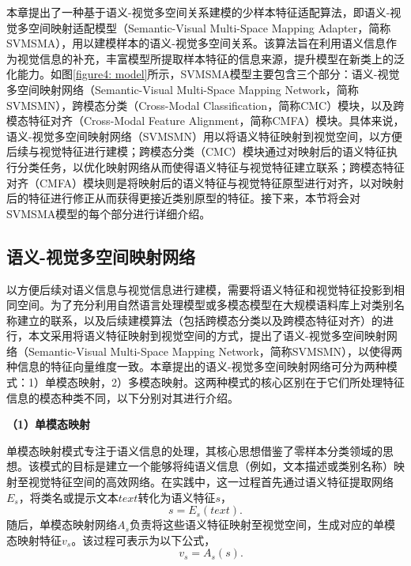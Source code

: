 本章提出了一种基于语义-视觉多空间关系建模的少样本特征适配算法，即语义-视觉多空间映射适配模型（Semantic-Visual Multi-Space Mapping Adapter，简称SVMSMA），用以建模样本的语义-视觉多空间关系。该算法旨在利用语义信息作为视觉信息的补充，丰富模型所提取样本特征的信息来源，提升模型在新类上的泛化能力。如图\ref{figure4: model}所示，SVMSMA模型主要包含三个部分：语义-视觉多空间映射网络（Semantic-Visual Multi-Space Mapping Network，简称SVMSMN），跨模态分类（Cross-Modal Classification，简称CMC）模块，以及跨模态特征对齐（Cross-Modal Feature Alignment，简称CMFA）模块。具体来说，语义-视觉多空间映射网络（SVMSMN）用以将语义特征映射到视觉空间，以方便后续与视觉特征进行建模；跨模态分类（CMC）模块通过对映射后的语义特征执行分类任务，以优化映射网络从而使得语义特征与视觉特征建立联系；跨模态特征对齐（CMFA）模块则是将映射后的语义特征与视觉特征原型进行对齐，以对映射后的特征进行修正从而获得更接近类别原型的特征。接下来，本节将会对SVMSMA模型的每个部分进行详细介绍。

\subsection[\hspace{-2pt}语义-视觉多空间映射网络]{{\heiti{} \hspace{-8pt}语义-视觉多空间映射网络}}\label{section4: 语义-视觉多空间映射网络}

以方便后续对语义信息与视觉信息进行建模，需要将语义特征和视觉特征投影到相同空间。为了充分利用自然语言处理模型或多模态模型在大规模语料库上对类别名称建立的联系，以及后续建模算法（包括跨模态分类以及跨模态特征对齐）的进行，本文采用将语义特征映射到视觉空间的方式，提出了语义-视觉多空间映射网络（Semantic-Visual Multi-Space Mapping Network，简称SVMSMN），以使得两种信息的特征向量维度一致。本章提出的语义-视觉多空间映射网络可分为两种模式：1）单模态映射，2）多模态映射。这两种模式的核心区别在于它们所处理特征信息的模态种类不同，以下分别对其进行介绍。

\textbf{（1）单模态映射}

单模态映射模式专注于语义信息的处理，其核心思想借鉴了零样本分类领域的思想。该模式的目标是建立一个能够将纯语义信息（例如，文本描述或类别名称）映射至视觉特征空间的高效网络。在实践中，这一过程首先通过语义特征提取网络$E_s$，将类名或提示文本$text$转化为语义特征$s$，
\begin{equation}
  \label{equation4: text to s}
  s = E_s(text).
\end{equation}
随后，单模态映射网络$A_s$负责将这些语义特征映射至视觉空间，生成对应的单模态映射特征$v_s$。该过程可表示为以下公式，
\begin{equation}
  \label{equation4: s to v_s}
  \quad v_s = A_s(s).
\end{equation}

